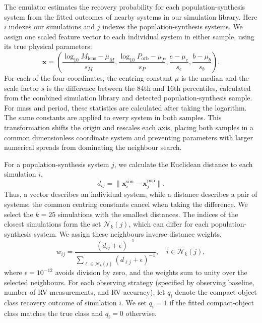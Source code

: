 \documentclass[fleqn,usenatbib]{mnras}
\begin{document}
The emulator estimates the recovery probability for each population-synthesis system from the fitted outcomes of nearby systems in our simulation library. Here $i$ indexes our simulations and $j$ indexes the population-synthesis systems. We assign one scaled feature vector to each individual system in either sample, using its true physical parameters:
\begin{equation}
    \mathbf{x} =
    \left(
    \frac{\log_{10} M_\mathrm{lens} - \mu_M}{s_M},
    \frac{\log_{10} P_\mathrm{orb} - \mu_P}{s_P},
    \frac{e - \mu_e}{s_e},
    \frac{b - \mu_b}{s_b}
    \right).
\end{equation}
For each of the four coordinates, the centring constant $\mu$ is the median and the scale factor $s$ is the difference between the 84th and 16th percentiles, calculated from the combined simulation library and detected population-synthesis sample. For mass and period, these statistics are calculated after taking the logarithm. The same constants are applied to every system in both samples. This transformation shifts the origin and rescales each axis, placing both samples in a common dimensionless coordinate system and preventing parameters with larger numerical spreads from dominating the neighbour search.

For a population-synthesis system $j$, we calculate the Euclidean distance to each simulation $i$,
\begin{equation}
    d_{ij} = \lVert\mathbf{x}^{\mathrm{sim}}_i - \mathbf{x}^{\mathrm{pop}}_j\rVert.
\end{equation}
Thus, a vector describes an individual system, while a distance describes a pair of systems; the common centring constants cancel when taking the difference. We select the $k=25$ simulations with the smallest distances. The indices of the closest simulations form the set $\mathcal{N}_k(j)$, which can differ for each population-synthesis system. We assign these neighbours inverse-distance weights,
\begin{equation}
    w_{ij} =
    \frac{(d_{ij} + \epsilon)^{-1}}
    {\sum_{\ell \in \mathcal{N}_k(j)} (d_{\ell j} + \epsilon)^{-1}},
    \quad i \in \mathcal{N}_k(j),
\end{equation}
where $\epsilon = 10^{-12}$ avoids division by zero, and the weights sum to unity over the selected neighbours. For each observing strategy (specified by observing baseline, number of RV measurements, and RV accuracy), let $q_i$ denote the compact-object class recovery outcome of simulation $i$. We set $q_i=1$ if the fitted compact-object class matches the true class and $q_i=0$ otherwise.
\end{document}

